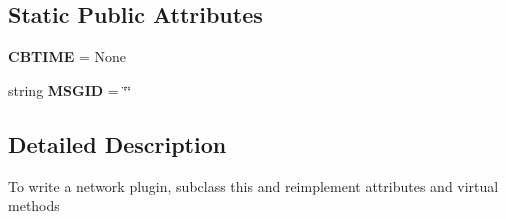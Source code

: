 \subsection*{\-Static \-Public \-Attributes}
\begin{DoxyCompactItemize}
\item 
\hypertarget{classplugins_1_1plugin_1_1_plugin_a6610c8a6ee2aa96841e955601a71048b}{{\bfseries \-C\-B\-T\-I\-M\-E} = \-None}\label{classplugins_1_1plugin_1_1_plugin_a6610c8a6ee2aa96841e955601a71048b}

\item 
\hypertarget{classplugins_1_1plugin_1_1_plugin_aef32d2e4903ca91abc7a719b7e6ce561}{string {\bfseries \-M\-S\-G\-I\-D} = \char`\"{}\char`\"{}}\label{classplugins_1_1plugin_1_1_plugin_aef32d2e4903ca91abc7a719b7e6ce561}

\end{DoxyCompactItemize}


\subsection{\-Detailed \-Description}
\begin{DoxyVerb}To write a network plugin, subclass this and reimplement attributes
and virtual methods\end{DoxyVerb}
 

